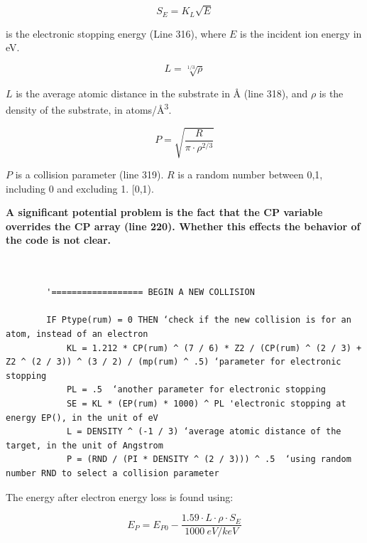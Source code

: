 \documentclass[10pt, reqno]{exam}
\begin{document}
\begin{equation}
    S_E = K_L \sqrt{E}
\end{equation}

is the electronic stopping energy (Line 316), where $E$ is the incident ion energy in eV. \par

\begin{equation}
    L = \sqrt[1/3]{\rho}
\end{equation}

$L$ is the average atomic distance in the substrate in \si{\angstrom} (line 318), and $\rho$ is the density of the substrate, in \si{atoms/\angstrom^{3}}. \par

\begin{equation}
    P = \sqrt{\frac{R}{\pi \cdot \rho^{2/3}}}
\end{equation}

$P$ is a collision parameter (line 319). $R$ is a random number between 0,1, including 0 and excluding 1. [0,1). \par

\textbf{A significant potential problem is the fact that the CP variable overrides the CP array (line 220). Whether this effects the behavior of the code is not clear.} \par

\begin{verbatim}   

    
        '================== BEGIN A NEW COLLISION
    
        IF Ptype(rum) = 0 THEN ‘check if the new collision is for an atom, instead of an electron
            KL = 1.212 * CP(rum) ^ (7 / 6) * Z2 / (CP(rum) ^ (2 / 3) + Z2 ^ (2 / 3)) ^ (3 / 2) / (mp(rum) ^ .5) ‘parameter for electronic stopping
            PL = .5  ‘another parameter for electronic stopping
            SE = KL * (EP(rum) * 1000) ^ PL 'electronic stopping at energy EP(), in the unit of eV
            L = DENSITY ^ (-1 / 3) ‘average atomic distance of the target, in the unit of Angstrom
            P = (RND / (PI * DENSITY ^ (2 / 3))) ^ .5  ‘using random number RND to select a collision parameter
\end{verbatim}

The energy after electron energy loss is found using:

\begin{equation}
    E_P = E_{P0} - \frac{1.59\cdot L \cdot \rho \cdot S_E}{\SI{1000}{eV/keV}}
\end{equation}
\end{document}
